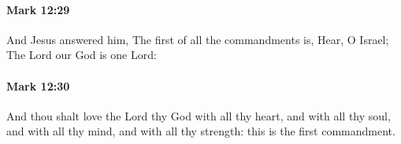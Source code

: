 		\paragraph{Mark 12:29} %
			\label{MARK-12-29}

			And Jesus answered him, The first of all the commandments is, Hear, O Israel; The Lord our God is one Lord:

			\begin{framed}
			\scriptsize
				\begin{compactdesc}
					\item[SBLG] 
				\end{compactdesc}
			\end{framed}

		\paragraph{Mark 12:30} %
			\label{MARK-12-30}

			And thou shalt love the Lord thy God with all thy heart, and with all thy soul, and with all thy mind, and with all thy strength: this is the first commandment.

